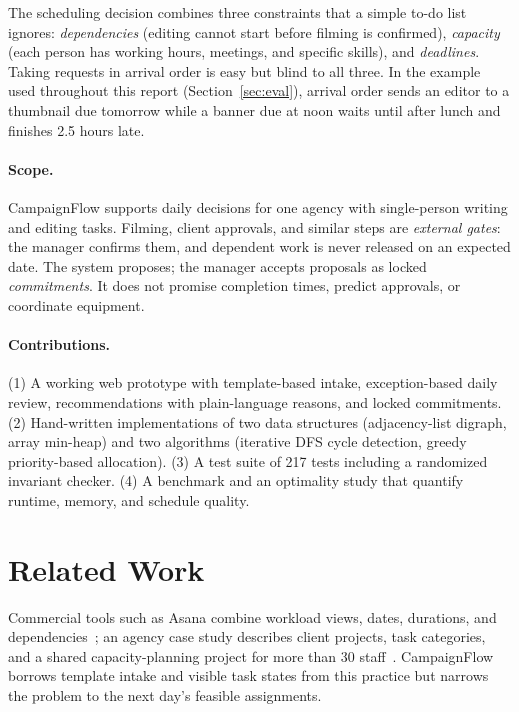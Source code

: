 \documentclass[sigconf,nonacm]{acmart}
\begin{document}
The scheduling decision combines three constraints that a simple to-do list ignores:
\emph{dependencies} (editing cannot start before filming is confirmed), \emph{capacity}
(each person has working hours, meetings, and specific skills), and \emph{deadlines}.
Taking requests in arrival order is easy but blind to all three. In the example used
throughout this report (Section~\ref{sec:eval}), arrival order sends an editor to a
thumbnail due tomorrow while a banner due at noon waits until after lunch and finishes
2.5 hours late.

\paragraph{Scope.} CampaignFlow supports daily decisions for one agency with
single-person writing and editing tasks. Filming, client approvals, and similar steps are
\emph{external gates}: the manager confirms them, and dependent work is never released on
an expected date. The system proposes; the manager accepts proposals as locked
\emph{commitments}. It does not promise completion times, predict approvals, or coordinate
equipment.

\paragraph{Contributions.} (1) A working web prototype with template-based intake,
exception-based daily review, recommendations with plain-language reasons, and locked
commitments. (2) Hand-written implementations of two data structures (adjacency-list
digraph, array min-heap) and two algorithms (iterative DFS cycle detection, greedy
priority-based allocation). (3) A test suite of 217 tests including a randomized invariant
checker. (4) A benchmark and an optimality study that quantify runtime, memory, and
schedule quality.

\section{Related Work}
Commercial tools such as Asana combine workload views, dates, durations, and
dependencies~\cite{asana-resource}; an agency case study describes client projects, task
categories, and a shared capacity-planning project for more than 30 staff~\cite{asana-engage}.
CampaignFlow borrows template intake and visible task states from this practice but narrows
the problem to the next day's feasible assignments.
\end{document}
